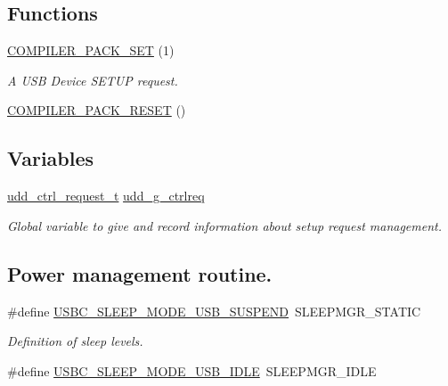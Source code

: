 \subsection*{\-Functions}
\begin{DoxyCompactItemize}
\item 
\hyperlink{group__udd__group_ga14096700b3ed8c5168615c5c5ee1c68d}{\-C\-O\-M\-P\-I\-L\-E\-R\-\_\-\-P\-A\-C\-K\-\_\-\-S\-E\-T} (1)
\begin{DoxyCompactList}\small\item\em \-A \-U\-S\-B \-Device \-S\-E\-T\-U\-P request. \end{DoxyCompactList}\item 
\hyperlink{group__udd__group_gabe317a1520896eaf568afab27dc71540}{\-C\-O\-M\-P\-I\-L\-E\-R\-\_\-\-P\-A\-C\-K\-\_\-\-R\-E\-S\-E\-T} ()
\end{DoxyCompactItemize}
\subsection*{\-Variables}
\begin{DoxyCompactItemize}
\item 
\hyperlink{structudd__ctrl__request__t}{udd\-\_\-ctrl\-\_\-request\-\_\-t} \hyperlink{group__udd__group_ga360872da67c7f8ecebe1238bbd4a536e}{udd\-\_\-g\-\_\-ctrlreq}
\begin{DoxyCompactList}\small\item\em \-Global variable to give and record information about setup request management. \end{DoxyCompactList}\end{DoxyCompactItemize}
\subsection*{\-Power management routine.}
\begin{DoxyCompactItemize}
\item 
\#define \hyperlink{group__udd__group_gaf5ca2932775dabb853197df18706c469}{\-U\-S\-B\-C\-\_\-\-S\-L\-E\-E\-P\-\_\-\-M\-O\-D\-E\-\_\-\-U\-S\-B\-\_\-\-S\-U\-S\-P\-E\-N\-D}~\-S\-L\-E\-E\-P\-M\-G\-R\-\_\-\-S\-T\-A\-T\-I\-C
\begin{DoxyCompactList}\small\item\em \-Definition of sleep levels. \end{DoxyCompactList}\item 
\#define \hyperlink{group__udd__group_ga90aeabbf00db4be8f0a1feef5cf0bbb3}{\-U\-S\-B\-C\-\_\-\-S\-L\-E\-E\-P\-\_\-\-M\-O\-D\-E\-\_\-\-U\-S\-B\-\_\-\-I\-D\-L\-E}~\-S\-L\-E\-E\-P\-M\-G\-R\-\_\-\-I\-D\-L\-E
\end{DoxyCompactItemize}
